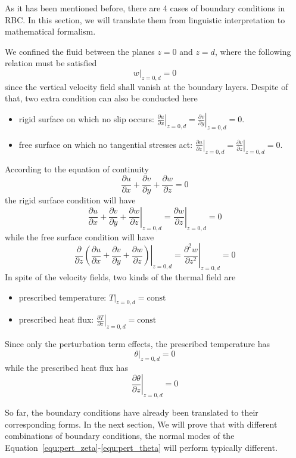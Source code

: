 As it has been mentioned before, there are 4 cases of boundary conditions in RBC. In this section, we will translate them from linguistic interpretation to mathematical formalism.\par
We confined the fluid between the planes \(z=0\) and \(z=d\), where the following relation must be satisfied
\begin{equation*}
\left.w\right|_{z=0,d}=0
\end{equation*}
since the vertical velocity field shall vanish at the boundary layers. Despite of that, two extra condition can also be conducted here
\begin{itemize}
	\item rigid surface on which no slip occurs: \(\left.\frac{\partial u}{\partial x}\right|_{z=0,d}=\left.\frac{\partial v}{\partial y}\right|_{z=0,d}=0\).
	\item free surface on which no tangential stresses act: \(\left.\frac{\partial u}{\partial z}\right|_{z=0,d}=\left.\frac{\partial v}{\partial z}\right|_{z=0,d}=0\).
\end{itemize}
According to the equation of continuity
\begin{equation}
\frac{\partial u}{\partial x}+\frac{\partial v}{\partial y}+\frac{\partial w}{\partial z}=0
\label{equ:continuity}
\end{equation}
the rigid surface condition will have
\begin{equation*}
\left.\frac{\partial u}{\partial x}+\frac{\partial v}{\partial y}+\frac{\partial w}{\partial z}\right|_{z=0,d}=\left.\frac{\partial w}{\partial z}\right|_{z=0,d}=0
\end{equation*}
while the free surface condition will have
\begin{equation*}
\left.\frac{\partial}{\partial z}\left(\frac{\partial u}{\partial x}+\frac{\partial v}{\partial y}+\frac{\partial w}{\partial z}\right)\right|_{z=0,d}=\left.\frac{\partial^2 w}{\partial z^2}\right|_{z=0,d}=0
\end{equation*}
In spite of the velocity fields, two kinds of the thermal field are
\begin{itemize}
	\item prescribed temperature: \(\left.T\right|_{z=0,d}=\text{const}\)
	\item prescribed heat flux: \(\left.\frac{\partial T}{\partial z}\right|_{z=0,d}=\text{const}\)
\end{itemize}
Since only the perturbation term effects, the prescribed temperature has
\begin{equation*}
\left.\theta\right|_{z=0,d}=0
\end{equation*}
while the prescribed heat flux has
\begin{equation*}
\left.\frac{\partial\theta}{\partial z}\right|_{z=0,d}=0
\end{equation*}\par
So far, the boundary conditions have already been translated to their corresponding forms. In the next section, We will prove that with different combinations of boundary conditions, the normal modes of the Equation~\ref{equ:pert_zeta}-\ref{equ:pert_theta} will perform typically different.\par

